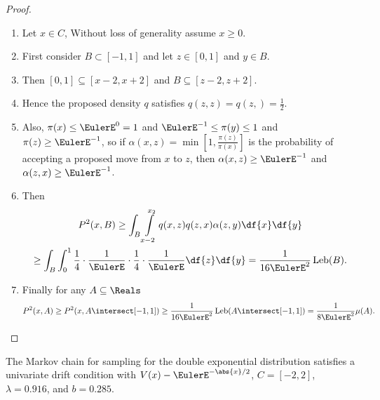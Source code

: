 \documentclass[12pt]{article}
\begin{document}
\begin{example}
    \begin{proof}
        \begin{enumerate}
            \item
                Let \( x \in C \), Without loss of generality assume \(
                x \ge 0 \).
            \item
                First consider \( B \subset [-1,1] \) and let \( z \in [0,1]
                \) and \( y \in B \).
            \item
                Then \( [0,1] \subseteq [x-2, x+2] \) and \( B \subseteq
                [z-2, z+2] \).
            \item
                Hence the proposed density \( q \) satisfies \( q(z,z) =
                q(z,) = \frac{1}{2} \).
            \item
                Also, \( \pi(x) \le \EulerE^0 = 1 \) and \( \EulerE^{-1}
                \le \pi(y) \le 1 \) and \( \pi(z) \ge \EulerE^{-1} \),
                so if \( \alpha(x,z) = \min[1, \frac{\pi(z)}{\pi(x)}] \)
                is the probability of accepting a proposed move from \(
                x \) to \( z \), then \( \alpha(x,z) \ge \EulerE^{-1} \)
                and \( \alpha(z,x) \ge \EulerE^{-1} \).
            \item
                Then
                \begin{multline*}
                    P^2(x,B) \ge \int_B \int\limits_{x-2}^{x_2} q(x,z) q
                    (z,x) \alpha(z,y) \df{x} \df{y} \\
                    \ge \int_B \int_0^1 \frac{1}{4} \cdot \frac{1}{\EulerE}
                    \cdot \frac{1}{4} \cdot \frac{1}{\EulerE} \df{z} \df
                    {y} = \frac{1}{16 \EulerE^2}
                    \operatorname{Leb}
                    (B).
                \end{multline*}
            \item
                Finally for any \( A \subseteq \Reals \)
                \[
                    P^2(x,A) \ge P^2(x,A \intersect [-1,1]) \ge \frac{1}
                    {16 \EulerE^2}
                    \operatorname{Leb}
                    (A \intersect [-1,1]) = \frac{1}{8 \EulerE^2} \mu(A).
                \]
        \end{enumerate}
    \end{proof}

    \begin{lemma}
        The Markov chain for sampling for the double exponential
        distribution satisfies a univariate drift condition with \( V(x)
        - \EulerE^{-\abs{x}/2} \), \( C = [-2,2] \), \( \lambda = 0.916 \),
        and \( b = 0.285 \).
    \end{lemma}


\end{example}
\end{document}
